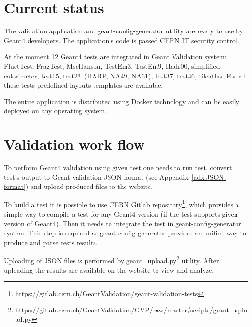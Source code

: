 \section{Current status}
\label{sec-status}

The validation application and geant-config-generator utility are ready to use by Geant4 developers. The application's code is passed CERN IT security control.

At the moment 12 Geant4 tests are integrated in Geant Validation system: FluctTest, FragTest, MscHanson, TestEm3, TestEm9, Hadr00, simplified calorimeter, test15, test22~(HARP, NA49, NA61), test37, test46, tileatlas. For all these tests predefined layouts templates are available.

The entire application is distributed using Docker technology and can be easily deployed on any operating system.

\section{Validation work flow}
\label{sec-workflow}

To perform Geant4 validation using given test one needs to run test, convert test's output to Geant validation JSON format (see Appendix~\ref{adx:JSON-format}) and upload produced files to the website.

To build a test it is possible to use CERN Gitlab repository\footnote{https://gitlab.cern.ch/GeantValidation/geant-validation-tests}, which provides a simple way to compile a test for any Geant4 version (if the test supports given version of Geant4).
Then it needs to integrate the test in geant-config-generator system. This step is required as geant-config-generator provides an unified way to produce and parse tests results. 

Uploading of JSON files is performed by geant\_upload.py\footnote{https://gitlab.cern.ch/GeantValidation/GVP/raw/master/scripts/geant\_upload.py} utility.
After uploading the results are available on the website to view and analyze.




